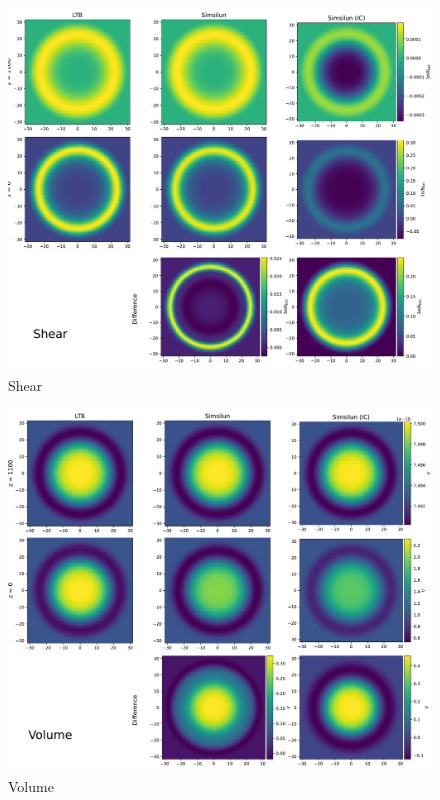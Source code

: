 \begin{figure}
    \centering
    \includegraphics[width=\textwidth]{../plots/Shear.pdf}
    \caption{Shear}
    \label{fig:shear}
\end{figure}



\begin{figure}
    \centering
    \includegraphics[width=\textwidth]{../plots/Volume.pdf}
    \caption{Volume}
    \label{fig:volume}
\end{figure}



